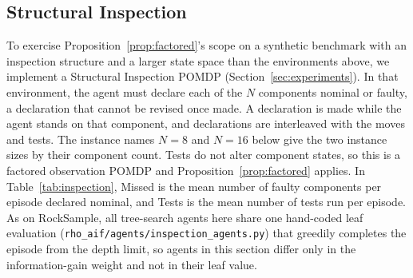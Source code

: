 \subsection{Structural Inspection}
\label{sec:inspection}

To exercise Proposition~\ref{prop:factored}'s scope on a synthetic benchmark with an inspection structure and a larger state space than the environments above, we implement a Structural Inspection POMDP (Section~\ref{sec:experiments}). In that environment, the agent must declare each of the $N$ components nominal or faulty, a declaration that cannot be revised once made. A declaration is made while the agent stands on that component, and declarations are interleaved with the moves and tests. The instance names $N{=}8$ and $N{=}16$ below give the two instance sizes by their component count. Tests do not alter component states, so this is a factored observation POMDP and Proposition~\ref{prop:factored} applies. In Table~\ref{tab:inspection}, Missed is the mean number of faulty components per episode declared nominal, and Tests is the mean number of tests run per episode. As on RockSample, all tree-search agents here share one hand-coded leaf evaluation (\texttt{rho\_\allowbreak aif/\allowbreak agents/\allowbreak inspection\_\allowbreak agents.py}) that greedily completes the episode from the depth limit, so agents in this section differ only in the information-gain weight and not in their leaf value.

